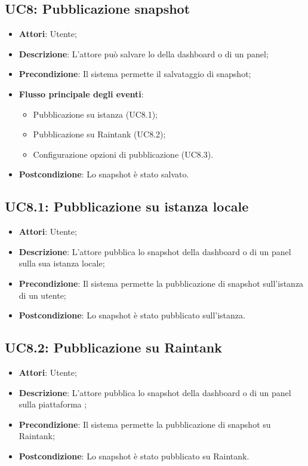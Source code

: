 \subsection{UC8: Pubblicazione snapshot}
\begin{itemize}
	\item \textbf{Attori}: Utente;
	\item \textbf{Descrizione}: L'attore può salvare lo  della dashboard o di un panel;
	\item \textbf{Precondizione}: Il sistema permette il salvataggio di snapshot;
	\item \textbf{Flusso principale degli eventi}:
	\begin{itemize}
		\item Pubblicazione su istanza (UC8.1);
		\item Pubblicazione su Raintank (UC8.2);
		\item Configurazione opzioni di pubblicazione (UC8.3).
	\end{itemize}
	\item \textbf{Postcondizione}: Lo snapshot è stato salvato.
\end{itemize}

\subsection{UC8.1: Pubblicazione su istanza locale}
\begin{itemize}
	\item \textbf{Attori}: Utente;
	\item \textbf{Descrizione}: L'attore pubblica lo snapshot della dashboard o di un panel sulla sua istanza locale;
	\item \textbf{Precondizione}: Il sistema permette la pubblicazione di snapshot sull'istanza di un utente;
	\item \textbf{Postcondizione}: Lo snapshot è stato pubblicato sull'istanza.
\end{itemize}

\subsection{UC8.2: Pubblicazione su Raintank}
\begin{itemize}
	\item \textbf{Attori}: Utente;
	\item \textbf{Descrizione}: L'attore pubblica lo snapshot della dashboard o di un panel sulla piattaforma ;
	\item \textbf{Precondizione}: Il sistema permette la pubblicazione di snapshot su Raintank;
	\item \textbf{Postcondizione}: Lo snapshot è stato pubblicato su Raintank.
\end{itemize}

